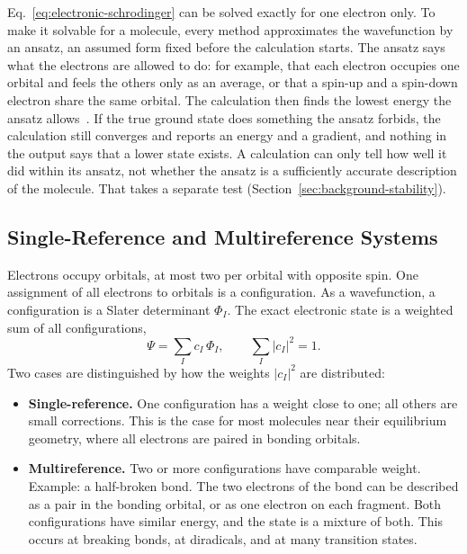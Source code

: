 Eq.~\eqref{eq:electronic-schrodinger} can be solved exactly for one
electron only. To make it solvable for a molecule, every method
approximates the wavefunction by an ansatz, an assumed form fixed
before the calculation starts. The ansatz says what the electrons are
allowed to do: for example, that each electron occupies one orbital
and feels the others only as an average, or that a spin-up and a
spin-down electron share the same orbital. The calculation then finds
the lowest energy the ansatz allows~\cite{szabo1996}. If the true
ground state does something the ansatz forbids, the calculation still
converges and reports an energy and a gradient, and nothing in the
output says that a lower state exists. A calculation can only tell how
well it did within its ansatz, not whether the ansatz is a
sufficiently accurate description of the molecule. That takes a
separate test (Section~\ref{sec:background-stability}).

\subsection{Single-Reference and Multireference Systems}
\label{sec:sr-vs-mr}

Electrons occupy orbitals, at most two per orbital with opposite spin. One
assignment of all electrons to orbitals is a configuration. As a
wavefunction, a configuration is a Slater determinant $\Phi_I$. The exact
electronic state is a weighted sum of all configurations,
%
\begin{equation}
  \Psi = \sum_I c_I \, \Phi_I , \qquad \sum_I |c_I|^2 = 1 .
  \label{eq:ci-expansion}
\end{equation}
%
Two cases are distinguished by how the weights $|c_I|^2$ are distributed:

\begin{itemize}
  \item \textbf{Single-reference.} One configuration has a weight close to
    one; all others are small corrections. This is the case for most
    molecules near their equilibrium geometry, where all electrons are paired
    in bonding orbitals.
  \item \textbf{Multireference.} Two or more configurations have comparable
    weight. Example: a half-broken bond. The two electrons of the bond can
    be described as a pair in the bonding orbital, or as one electron on
    each fragment. Both configurations have similar energy, and the state is
    a mixture of both. This occurs at breaking bonds, at diradicals, and at
    many transition states.
\end{itemize}

